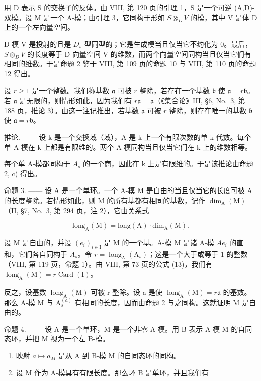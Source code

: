 用 D 表示 S 的交换子的反体。由 VIII, 第 120 页的引理 1，S 是一个可逆 (A,D)-双模。设 M 是一个 A-模；由引理 3，它同构于形如 \(S \otimes_{D} V\) 的模，其中 V 是体 D 上的一个左向量空间。

D-模 V 是投射的且是 \(D_{s}\) 型同型的；它是生成模当且仅当它不约化为 0。最后，\(S \otimes_{D} V\) 的长度等于 D-向量空间 V 的维数，而两个向量空间同构当且仅当它们有相同的维数。于是命题 2 鉴于 VIII, 第 109 页的命题 10 与 VIII, 第 110 页的命题 12 得出。

设 \(r \geqslant 1\) 是一个整数。我们称基数 \(\mathfrak{a}\) 可被 \(r\) 整除，若存在一个基数 \(\mathfrak{b}\) 使 \(\mathfrak{a} = r\mathfrak{b}\)。若 \(\mathfrak{a}\) 是无限的，则情形如此，因为我们有 \(r\mathfrak{a} = \mathfrak{a}\)（《集合论》III, §6, No.~3, 第 188 页，推论 3）。由这一注记推出，若基数 \(\mathfrak{a}\) 可被 \(r\) 整除，则存在唯一的基数 \(\mathfrak{b}\) 使 \(\mathfrak{a} = r\mathfrak{b}\)。

推论. —— 设 k 是一个交换域（域），A 是 k 上一个有限次数的单 k-代数。每个单 A-模在 k 上都是有限维的。两个 A-模同构当且仅当它们在 k 上的维数相等。

每个单 A-模都同构于 \(A_{s}\) 的一个商，因此在 k 上是有限维的。于是该推论由命题 2, c) 得出。

命题 3. —— 设 A 是一个单环。一个 A-模 M 是自由的当且仅当它的长度可被 A 的长度整除。若情形如此，则 M 的所有基都有相同的基数，记作 \(\dim_{\mathrm{A}}(\mathrm{M})\)（II, §7, No.~3, 第 294 页，注 2），它由关系式

\[
\mathrm{long} _ {\mathrm{A}} (\mathrm{M}) = \mathrm{long} (\mathrm{A}) \cdot \mathrm{dim} _ {\mathrm{A}} (\mathrm{M}).\tag{1}
\]

设 M 是自由的，并设 \((e_{i})_{i\in\mathrm{I}}\) 是 M 的一个基。A-模 M 是诸 A-模 \(Ae_{i}\) 的直和，它们各自同构于 \(A_{s}\)。令 \(r=\operatorname{long}_{\mathrm{A}}(\mathrm{A}_{s})\)；这是一个大于或等于 1 的整数（VIII, 第 119 页，命题 1）。由 VIII, 第 73 页的公式 (13)，我们有 \(\operatorname{long}_{\mathrm{A}}(\mathrm{M})=r\operatorname{Card}(\mathrm{I})\)。

反之，设基数 \(\operatorname{long}_{\mathrm{A}}(\mathrm{M})\) 可被 r 整除。设 a 是使 \(\operatorname{long}_{\mathrm{A}}(\mathrm{M}) = r\mathfrak{a}\) 的基数。那么 A-模 M 与 \(\mathrm{A}_{s}^{(\mathfrak{a})}\) 有相同的长度，因而由命题 2 与之同构。这就证明 M 是自由的。

命题 4. —— 设 A 是一个单环，M 是一个非零 A-模。用 B 表示 A-模 M 的自同态环，并把 M 视为一个左 B-模。

\begin{enumerate}
\def\labelenumi{\alph{enumi})}
\item
  映射 \(a \mapsto a_{M}\) 是从 A 到 B-模 M 的自同态环的同构。
\item
  设 M 作为 A-模具有有限长度。那么环 B 是单环，并且我们有
\end{enumerate}

